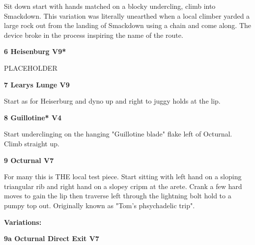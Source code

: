 \begin{multicols}{2}
\begin{adjustwidth}{0.5cm}{}
\begin{minipage}{\linewidth}
							\begin{adjustwidth}{0.5cm}{}				
							Sit down start with hands matched on a blocky undercling, climb into Smackdown. This variation was literally unearthed when a local climber yarded a large rock out from the landing of Smackdown using a chain and come along. The device broke in the process inspiring the name of the route.
							\end{adjustwidth}
							\end{minipage}
						\end{adjustwidth}
					\begin{minipage}{\linewidth}	
					\label{rt:Heisenburg}
\colorbox{Goldenrod!50}{
\textbf{
6 Heisenburg V9*  
}
}

					\begin{adjustwidth}{0.5cm}{}				
					PLACEHOLDER
					\end{adjustwidth}
					\end{minipage}

					\begin{minipage}{\linewidth}	
					\label{rt:Learys Lunge}
\colorbox{Goldenrod!50}{
\textbf{
7 Learys Lunge V9     
}
}

					\begin{adjustwidth}{0.5cm}{}				
					Start as for Heiserburg and dyno up and right to juggy holds at the lip.
					\end{adjustwidth}
					\end{minipage}
					\begin{minipage}{\linewidth}	
					\label{rt:Guillotine}
\colorbox{RoyalBlue!20}{
\textbf{
8 Guillotine* V4    
}
}

					\begin{adjustwidth}{0.5cm}{}				
					Start underclinging on the hanging "Guillotine blade" flake left of Octurnal. Climb straight up.
					\end{adjustwidth}
					\end{minipage}
					\begin{minipage}{\linewidth}	
					\label{rt:Octurnal}
\colorbox{Goldenrod!50}{
\textbf{
9 Octurnal V7     
}
}

					\begin{adjustwidth}{0.5cm}{}				
					For many this is THE local test piece. Start sitting with left hand on a sloping triangular rib and right hand on a slopey cripm at the arete. Crank a few hard moves to gain the lip then traverse left through the lightning bolt hold to a pumpy top out. Originally known as "Tom's phsychadelic trip".
					\end{adjustwidth}
					\end{minipage}
						\begin{adjustwidth}{0.5cm}{}				
						\textbf{Variations:} \newline
							\begin{minipage}{\linewidth}	
							\label{vr:Octurnal Direct Exit}
\colorbox{Goldenrod!50}{
\textbf{
9a Octurnal Direct Exit V7     
}
}


\end{minipage}
\end{adjustwidth}
\end{multicols}
